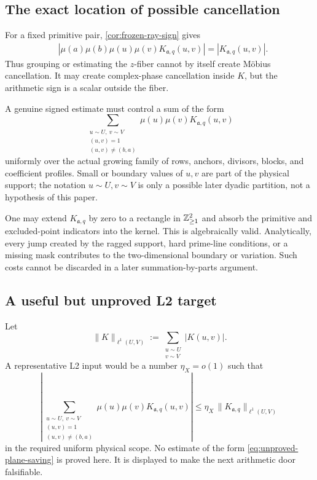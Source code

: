 \subsection{The exact location of possible cancellation}

For a fixed primitive pair, \cref{cor:frozen-ray-sign} gives
\begin{equation}
\begin{aligned}
 &\left|
 \mu(a)\mu(b)\mu(u)\mu(v)
 K_{\mathfrak a,q}(u,v)
 \right|
 =
 |K_{\mathfrak a,q}(u,v)|.
\end{aligned}
\label{eq:fiber-absolute-value}
\end{equation}
Thus grouping or estimating the \(z\)-fiber cannot by itself create
M\"obius cancellation.  It may create complex-phase cancellation inside
\(K\), but the arithmetic sign is a scalar outside the fiber.

A genuine signed estimate must control a sum of the form
\begin{equation}
 \sum_{\substack{u\sim U,\ v\sim V\\(u,v)=1\\(u,v)\ne(b,a)}}
 \mu(u)\mu(v)K_{\mathfrak a,q}(u,v)
 \label{eq:dyadic-primitive-plane-target}
\end{equation}
uniformly over the actual growing family of rows, anchors, divisors,
blocks, and coefficient profiles.  Small or boundary values of \(u,v\)
are part of the physical support; the notation \(u\sim U,v\sim V\) is only
a possible later dyadic partition, not a hypothesis of this paper.

\begin{remark}
\label{rem:zero-extension-boundary-cost}
One may extend \(K_{\mathfrak a,q}\) by zero to a rectangle in
\(\mathbb Z_{\ge1}^2\) and absorb the primitive and excluded-point indicators
into the kernel.  This is algebraically valid.  Analytically, every jump
created by the ragged support, hard prime-line conditions, or a missing
mask contributes to the two-dimensional boundary or variation.  Such
costs cannot be discarded in a later summation-by-parts argument.
\end{remark}

\subsection{A useful but unproved L2 target}

Let
\[
 \|K\|_{\ell^1(U,V)}
 :=
 \sum_{\substack{u\sim U\\v\sim V}}|K(u,v)|.
\]
A representative L2 input would be a number \(\eta_X=o(1)\) such that
\begin{equation}
 \left|
 \sum_{\substack{u\sim U,\ v\sim V\\(u,v)=1\\(u,v)\ne(b,a)}}
 \mu(u)\mu(v)K_{\mathfrak a,q}(u,v)
 \right|
 \le
 \eta_X\,
 \|K_{\mathfrak a,q}\|_{\ell^1(U,V)}
 \label{eq:unproved-plane-saving}
\end{equation}
in the required uniform physical scope.  No estimate of the form
\eqref{eq:unproved-plane-saving} is proved here.  It is displayed to make
the next arithmetic door falsifiable.
